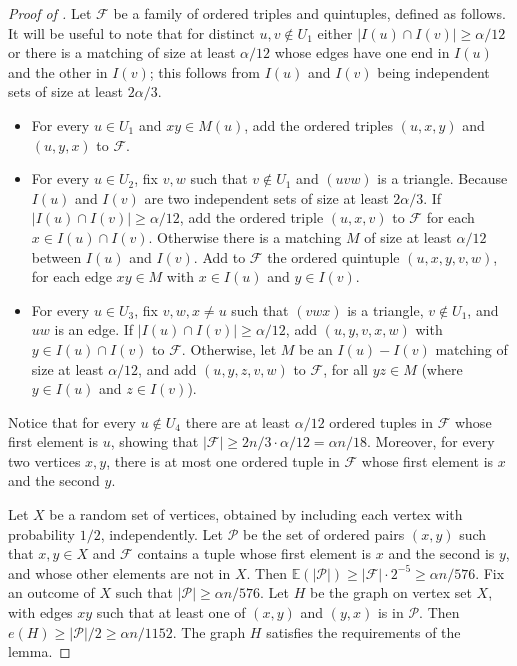 \documentclass[11pt,english]{article}
\theoremstyle{plain}
\theoremstyle{definition}
\theoremstyle{remark}
\newcommand{\cP}{\mathcal{P}}
\newcommand{\cF}{\mathcal{F}}
\newcommand{\Ex}{\mathbb{E}}
\begin{document}
\begin{proof}[Proof of ]
			Let $\cF$ be a family of ordered triples and quintuples, defined as follows. 
			It will be useful to note that for distinct $u,v \notin U_1$ either $|I(u) \cap I(v)| \ge \alpha/12$ or there is a matching of size at least $\alpha/12$ whose edges have one end in $I(u)$ and the other in $I(v)$; this follows from $I(u)$ and $I(v)$ being independent sets of size at least $2\alpha/3$.
			\begin{itemize}
				\item
					For every $u \in U_1$ and $xy \in M(u)$, add the ordered triples $(u,x,y)$ and $(u, y, x)$ to $\cF$.
				\item
					For every $u \in U_2$, fix $v, w$ such that $v \notin U_1$ and $(uvw)$ is a triangle.
					Because $I(u)$ and $I(v)$ are two independent sets of size at least $2\alpha/3$.
					If $|I(u) \cap I(v)| \ge \alpha/12$, add the ordered triple $(u,x,v)$ to $\cF$ for each $x \in I(u) \cap I(v)$. 
					Otherwise there is a matching $M$ of size at least $\alpha/12$ between $I(u)$ and $I(v)$. Add to $\cF$ the ordered quintuple $(u, x, y, v, w)$, for each edge $xy \in M$ with $x \in I(u)$ and $y \in I(v)$.
				\item
					For every $u \in U_3$, fix $v, w, x \neq u$ such that $(v w x)$ is a triangle, $v \notin U_1$, and $uw$ is an edge. If $|I(u) \cap I(v)| \ge \alpha/12$, add $(u, y, v, x, w)$ with $y \in I(u) \cap I(v)$ to $\cF$. Otherwise, let $M$ be an $I(u)-I(v)$ matching of size at least $\alpha/12$, and add $(u, y, z, v, w)$ to $\cF$, for all $yz \in M$ (where $y \in I(u)$ and $z \in I(v)$). 
			\end{itemize}
			Notice that for every $u \notin U_4$ there are at least $\alpha/12$ ordered tuples in $\cF$ whose first element is $u$, showing that $|\cF| \ge 2n/3 \cdot \alpha/12 = \alpha n/18$. Moreover, for every two vertices $x,y$, there is at most one ordered tuple in $\cF$ whose first element is $x$ and the second $y$.

			Let $X$ be a random set of vertices, obtained by including each vertex with probability $1/2$, independently. 
			Let $\cP$ be the set of ordered pairs $(x,y)$ such that $x,y \in X$ and $\cF$ contains a tuple whose first element is $x$ and the second is $y$, and whose other elements are not in $X$.
			Then $\Ex(|\cP|) \ge |\cF| \cdot 2^{-5} \ge \alpha n / 576$. Fix an outcome of $X$ such that $|\cP| \ge \alpha n / 576$.
			Let $H$ be the graph on vertex set $X$, with edges $xy$ such that at least one of $(x,y)$ and $(y,x)$ is in $\cP$. Then $e(H) \ge |\cP|/2 \ge \alpha n / 1152$. The graph $H$ satisfies the requirements of the lemma.
		\end{proof}
\end{document}
